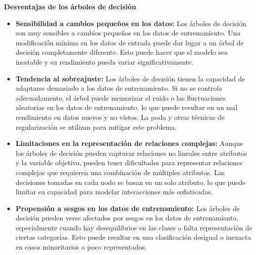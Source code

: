 \textbf{Desventajas de los árboles de decisión}
\begin{itemize}
    \item \textbf{Sensibilidad a cambios pequeños en los datos:} Los árboles de decisión son muy sensibles a cambios pequeños en los datos de entrenamiento. Una modificación mínima en los datos de entrada puede dar lugar a un árbol de decisión completamente diferente. Esto puede hacer que el modelo sea inestable y su rendimiento pueda variar significativamente.
    \item \textbf{Tendencia al sobreajuste:} Los árboles de decisión tienen la capacidad de adaptarse demasiado a los datos de entrenamiento. Si no se controla adecuadamente, el árbol puede memorizar el ruido o las fluctuaciones aleatorias en los datos de entrenamiento, lo que puede resultar en un mal rendimiento en datos nuevos y no vistos. La poda y otras técnicas de regularización se utilizan para mitigar este problema.
    \item \textbf{Limitaciones en la representación de relaciones complejas:} Aunque los árboles de decisión pueden capturar relaciones no lineales entre atributos y la variable objetivo, pueden tener dificultades para representar relaciones complejas que requieren una combinación de múltiples atributos. Las decisiones tomadas en cada nodo se basan en un solo atributo, lo que puede limitar su capacidad para modelar interacciones más sofisticadas.
    \item \textbf{Propensión a sesgos en los datos de entrenamiento:} Los árboles de decisión pueden verse afectados por sesgos en los datos de entrenamiento, especialmente cuando hay desequilibrios en las clases o falta representación de ciertas categorías. Esto puede resultar en una clasificación desigual o inexacta en casos minoritarios o poco representados.
\end{itemize}